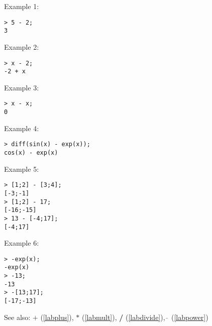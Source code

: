 \noindent Example 1: 
\begin{center}\begin{minipage}{15cm}\begin{Verbatim}[frame=single]
> 5 - 2;
3
\end{Verbatim}
\end{minipage}\end{center}
\noindent Example 2: 
\begin{center}\begin{minipage}{15cm}\begin{Verbatim}[frame=single]
> x - 2;
-2 + x
\end{Verbatim}
\end{minipage}\end{center}
\noindent Example 3: 
\begin{center}\begin{minipage}{15cm}\begin{Verbatim}[frame=single]
> x - x;
0
\end{Verbatim}
\end{minipage}\end{center}
\noindent Example 4: 
\begin{center}\begin{minipage}{15cm}\begin{Verbatim}[frame=single]
> diff(sin(x) - exp(x));
cos(x) - exp(x)
\end{Verbatim}
\end{minipage}\end{center}
\noindent Example 5: 
\begin{center}\begin{minipage}{15cm}\begin{Verbatim}[frame=single]
> [1;2] - [3;4];
[-3;-1]
> [1;2] - 17;
[-16;-15]
> 13 - [-4;17];
[-4;17]
\end{Verbatim}
\end{minipage}\end{center}
\noindent Example 6: 
\begin{center}\begin{minipage}{15cm}\begin{Verbatim}[frame=single]
> -exp(x);
-exp(x)
> -13;
-13
> -[13;17];
[-17;-13]
\end{Verbatim}
\end{minipage}\end{center}
See also: \textbf{$+$} (\ref{labplus}), \textbf{$*$} (\ref{labmult}), \textbf{/} (\ref{labdivide}), \textbf{$\mathbf{\hat{~}}$} (\ref{labpower})
